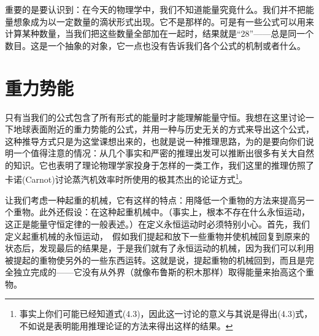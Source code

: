 \documentclass[11pt,oneside]{book}
\begin{document}
\begin{common-format}
重要的是要认识到：在今天的物理学中，我们不知道能量究竟什么。我们并不把能量想象成为以一定数量的滴状形式出现。它不是那样的。可是有一些公式可以用来计算某种数量，当我们把这些数量全部加在一起时，结果就是“28”——总是同一个数目。这是一个抽象的对象，它一点也没有告诉我们各个公式的机制或者什么。


\section{重力势能}
只有当我们的公式包含了所有形式的能量时才能理解能量守恒。我想在这里讨论一下地球表面附近的重力势能的公式，并用一种与历史无关的方式来导出这个公式，这种推导方式只是为这堂课想出来的，也就是说一种推理思路，为的是要向你们说明一个值得注意的情况：从几个事实和严密的推理出发可以推断出很多有关大自然的知识。它也表明了理论物理学家投身于怎样的一类工作，我们这里的推理仿照了卡诺(Carnot)讨论蒸汽机效率时所使用的极其杰出的论证方式\footnote{事实上你们可能已经知道式(4.3)，因此这一讨论的意义与其说是得出(4.3)式，不如说是表明能用推理论证的方法来得出这样的结果。}。

让我们考虑一种起重的机械，它有这样的特点：用降低一个重物的方法来提高另一个重物。此外还假设：在这种起重机械中。（事实上，根本不存在什么永恒运动，这正是能量守恒定律的一般表述。）在定义永恒运动时必须特别小心。首先，我们定义起重机械的永恒运动，　假如我们提起和放下一些重物并使机械回复到原来的状态后，发现最后的结果是，于是我们就有了永恒运动的机械，因为我们可以利用被提起的重物使另外的一些东西运转。这就是说，提起重物的机械回到，而且是完全独立完成的——它没有从外界（就像布鲁斯的积木那样）取得能量来抬高这个重物。


\end{common-format}
\end{document}
